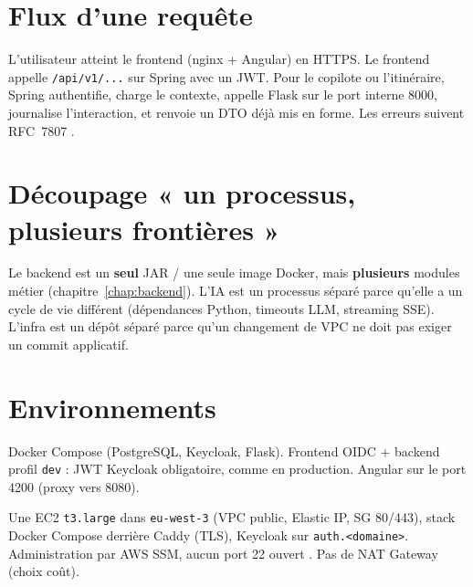 \section{Flux d'une requête}


L'utilisateur atteint le frontend (nginx + Angular) en HTTPS. Le frontend appelle \texttt{/api/v1/...} sur Spring avec un JWT. Pour le copilote ou l'itinéraire, Spring authentifie, charge le contexte, appelle Flask sur le port interne 8000, journalise l'interaction, et renvoie un DTO déjà mis en forme. Les erreurs suivent RFC~7807 \cite{rfc7807}.

\section{Découpage « un processus, plusieurs frontières »}

Le backend est un \textbf{seul} JAR / une seule image Docker, mais \textbf{plusieurs} modules métier (chapitre~\ref{chap:backend}). L'IA est un processus séparé parce qu'elle a un cycle de vie différent (dépendances Python, timeouts LLM, streaming SSE). L'infra est un dépôt séparé parce qu'un changement de VPC ne doit pas exiger un commit applicatif.

\section{Environnements}

\begin{description}[style=nextline,leftmargin=1.2cm]
  \item[Local] Docker Compose (PostgreSQL, Keycloak, Flask). Frontend OIDC + backend profil \texttt{dev} : JWT Keycloak obligatoire, comme en production. Angular sur le port 4200 (proxy vers 8080).
  \item[Cloud (AWS)] Une EC2 \texttt{t3.large} dans \texttt{eu-west-3} (VPC public, Elastic IP, SG 80/443), stack Docker Compose derrière Caddy (TLS), Keycloak sur \texttt{auth.<domaine>}. Administration par AWS SSM, aucun port 22 ouvert \cite{awsssm}. Pas de NAT Gateway (choix coût).
\end{description}
